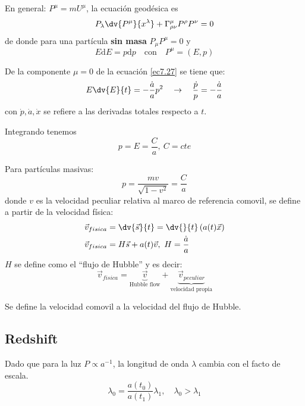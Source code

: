 \documentclass[../main]{subfiles}
\begin{document}
En general: $P^{\mu}=mU^{\mu}$, la ecuación geodésica es 
\begin{equation}
    P_{\lambda}\dv{P^{\mu}}{x^{\lambda}}+\Gamma^{\mu}_{\rho\nu}P^{\rho}P^{\nu}=0
    \label{ec7.27}
\end{equation}
de donde para una partícula \textbf{sin masa} $P_{\mu}P^{\mu}=0$ y
\begin{equation}
    E\mathrm{d}E=p\mathrm{d}p\quad \text{con} \quad P^{\mu}=(E, p)
\end{equation}

De la componente $\mu=0$ de la ecuación \eqref{ec7.27} se tiene que:
\begin{equation}
    E\dv{E}{t}=-\dfrac{\dot{a}}{a}p^2 \quad \rightarrow \quad \dfrac{\dot{p}}{p}=-\dfrac{\dot{a}}{a}
\end{equation}
con $\dot{p}, \dot{a}, \dot{x}$ se refiere a las derivadas totales respecto a $t$.

Integrando tenemos
\begin{equation}
    p=E=\dfrac{C}{a}, \ C=cte
\end{equation}

Para partículas masivas:
\begin{equation}
    p=\dfrac{mv}{\sqrt{1-v^2}}=\dfrac{C}{a}
\end{equation}
donde $v$ es la velocidad peculiar relativa al marco de referencia comovil, se define a partir de la velocidad física:
\begin{equation}
    \begin{split}
        \vec{v}_{fisica}&=\dv{\vec{s}}{t}=\dv{}{t}\left(a(t)\vec{x}\right)\\
        \vec{v}_{fisica}&=H\vec{s}+a(t)\vec{v},\ H=\dfrac{\dot{a}}{a}
    \end{split}
\end{equation}
$H$ se define como el ``flujo de Hubble'' y es decir:
\begin{equation}
    \vec{v}_{fisica}=\underbrace{\vec{v}}_{\text{Hubble flow}}+\underbrace{\vec{v}_{peculiar}}_{\text{velocidad propia}}
\end{equation}

Se define la velocidad comovil a la velocidad del flujo de Hubble.

\subsection{Redshift}

Dado que para la luz $P \propto a^{-1}$, la longitud de onda $\lambda$ cambia con el facto de escala.
\begin{equation}
    \lambda_0=\dfrac{a(t_0)}{a(t_1)}\lambda_1,\quad \lambda_0>\lambda_1
\end{equation}
\end{document}
